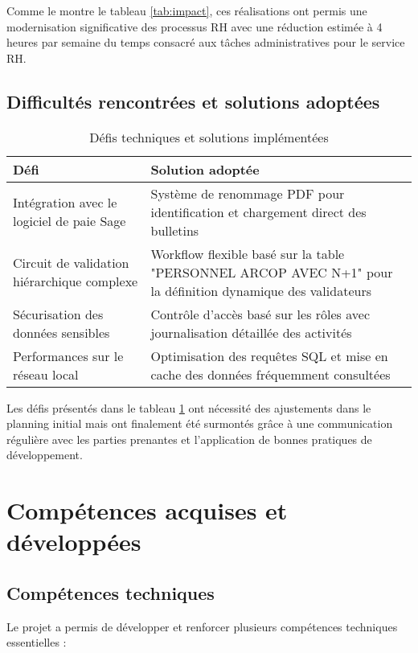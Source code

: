 Comme le montre le tableau \ref{tab:impact}, ces réalisations ont permis une modernisation significative des processus RH avec une réduction estimée à 4 heures par semaine du temps consacré aux tâches administratives pour le service RH.

\subsection{Difficultés rencontrées et solutions adoptées}

\begin{table}[H]
\centering
\caption{Défis techniques et solutions implémentées}
\label{tab:defis}
\begin{tabular}{|p{6cm}|p{8cm}|}
\hline
\textbf{Défi} & \textbf{Solution adoptée} \\
\hline
Intégration avec le logiciel de paie Sage & Système de renommage PDF pour identification et chargement direct des bulletins \\
\hline
Circuit de validation hiérarchique complexe & Workflow flexible basé sur la table "PERSONNEL ARCOP AVEC N+1" pour la définition dynamique des validateurs \\
\hline
Sécurisation des données sensibles & Contrôle d'accès basé sur les rôles avec journalisation détaillée des activités \\
\hline
Performances sur le réseau local & Optimisation des requêtes SQL et mise en cache des données fréquemment consultées \\
\hline
\end{tabular}
\end{table}

Les défis présentés dans le tableau \ref{tab:defis} ont nécessité des ajustements dans le planning initial mais ont finalement été surmontés grâce à une communication régulière avec les parties prenantes et l'application de bonnes pratiques de développement.

\section{Compétences acquises et développées}

\subsection{Compétences techniques}
Le projet a permis de développer et renforcer plusieurs compétences techniques essentielles :

